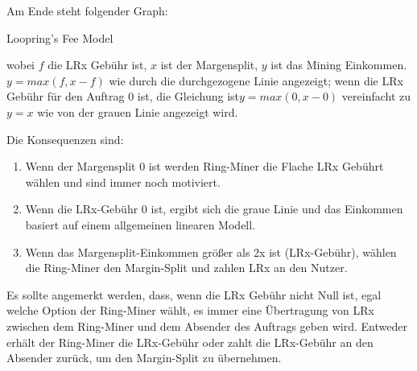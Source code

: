 \documentclass[UTF8,nofonts]{article}
\makeatletter
\newenvironment{figurehere}
 {\def\@captype{figure}}
 {}
\makeatother
\begin{document}
\begin{multicols}{2}
Am Ende steht folgender Graph:

\begin{center}
\begin{figurehere}
\centering
{}
\caption{Loopring's Fee Model}
\label{fig:feemodel}
\end{figurehere}
\end{center}


wobei $f$ die LRx Gebühr ist, $x$ ist der Margensplit, $y$ ist das Mining Einkommen. $y=max(f, x-f)$ wie durch die durchgezogene Linie angezeigt; wenn die LRx Gebühr für den Auftrag $0$ ist, die Gleichung ist$y=max(0, x - 0)$ vereinfacht zu $y=x$ wie von der grauen Linie angezeigt wird.


Die Konsequenzen sind:
\begin{enumerate}
	\item Wenn der Margensplit 0 ist werden Ring-Miner die Flache LRx Gebührt wählen und sind immer noch motiviert.
	\item Wenn die LRx-Gebühr 0 ist, ergibt sich die graue Linie und das Einkommen basiert auf einem allgemeinen linearen Modell.
	\item Wenn das Margensplit-Einkommen größer als 2x ist (LRx-Gebühr), wählen die Ring-Miner den Margin-Split und zahlen LRx an den Nutzer.
\end{enumerate}

Es sollte angemerkt werden, dass, wenn die LRx Gebühr nicht Null ist, egal welche Option der Ring-Miner wählt, es immer eine Übertragung von LRx zwischen dem Ring-Miner und dem Absender des Auftrags geben wird. Entweder erhält der Ring-Miner die LRx-Gebühr oder zahlt die LRx-Gebühr an den Absender zurück, um den Margin-Split zu übernehmen.


\end{multicols}
\end{document}
